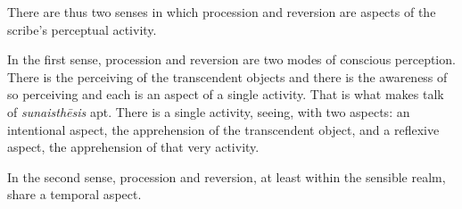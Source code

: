 There are thus two senses in which procession and reversion are aspects of the scribe's perceptual activity.

In the first sense, procession and reversion are two modes of conscious perception. There is the perceiving of the transcendent objects and there is the awareness of so perceiving and each is an aspect of a single activity. That is what makes talk of \emph{sunaisthēsis} apt. There is a single activity, seeing, with two aspects: an intentional aspect, the apprehension of the transcendent object, and a reflexive aspect, the apprehension of that very activity.

In the second sense, procession and reversion, at least within the sensible realm, share a temporal aspect.




